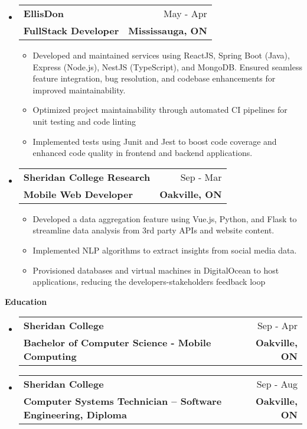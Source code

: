 \documentclass[letterpaper,11.9pt,arimo]{article}[leftmargin=*]
\makeatletter
\def \entryspacing {-2pt}
\renewcommand{\section}[2]{\vspace{5pt}
\colorbox{secondary}{\color{white}\raggedbottom\normalsize\textbf{{#1}{\hspace{7pt}#2}}}
}
\newcommand{\resumeEntryStart}{\begin{itemize}[leftmargin=2.5mm]}
\newcommand{\resumeEntryEnd}{\end{itemize}\vspace{\entryspacing}}
\newcommand{\resumeItemListStart}{\begin{itemize}[leftmargin=4.5mm]}
\newcommand{\resumeItemListEnd}{\end{itemize}}
\newcommand{\resumeItem}[1]{
    \item\small{
            {#1 \vspace{-3pt}}
    }
}
\newcommand{\resumeEntryTSDL}[4]{
    \vspace{-1pt}\item[]
    \begin{tabularx}{0.97\textwidth}{X@{\hspace{60pt}}r}
    \textbf{\color{primary}#1} & {\firabook\color{accent}\small#2} \\
    \textbf{\color{accent}\small#3} & \textbf{\color{accent}\small#4} \\
    \end{tabularx}\vspace{-6pt}
}
\newcommand{\boldsize}[1]{\fontsize{10}{15}\selectfont\color{secondary}\textbf{#1}}
\makeatother
\begin{document}
    \resumeEntryStart
    \resumeEntryTSDL
    {EllisDon}{May \text{2019} - Apr \text{2020}}
    {\boldsize{FullStack Developer}}{Mississauga, ON}
    \resumeItemListStart
    \resumeItem{Developed and maintained services using ReactJS, Spring Boot (Java), Express (Node.js), NestJS (TypeScript), and MongoDB. Ensured seamless feature integration, bug resolution, and codebase enhancements for improved maintainability.}
    \resumeItem{Optimized project maintainability through automated CI pipelines for unit testing and code linting}
    \resumeItem{ Implemented tests using Junit and Jest to boost code coverage and enhanced code quality in frontend and backend applications.}
    \resumeItemListEnd
    \resumeEntryEnd
    \resumeEntryStart
    \resumeEntryTSDL
    {Sheridan College Research}{Sep \text{2018} - Mar \text{2019}}
    {\boldsize{Mobile Web Developer}}{Oakville, ON}
    \resumeItemListStart
    \resumeItem{Developed a data aggregation feature using Vue.js, Python, and Flask to streamline data analysis from 3rd party APIs and website content.}
    \resumeItem{Implemented NLP algorithms to extract insights from social media data.}
    \resumeItem{Provisioned databases and virtual machines in DigitalOcean to host applications, reducing the developers-stakeholders feedback loop}

    \resumeItemListEnd
    \resumeEntryEnd


    \section{\faGraduationCap}{Education}

    \resumeEntryStart
    \resumeEntryTSDL
    {Sheridan College}{Sep \text{2016} - Apr \text{2020}}
    {Bachelor of Computer Science - Mobile Computing}{Oakville, ON}
    \resumeEntryTSDL
    {Sheridan College}{Sep \text{2014} - Aug \text{2016}}
    {Computer Systems Technician – Software Engineering, Diploma}{Oakville, ON}

    \resumeEntryEnd
\end{document}
